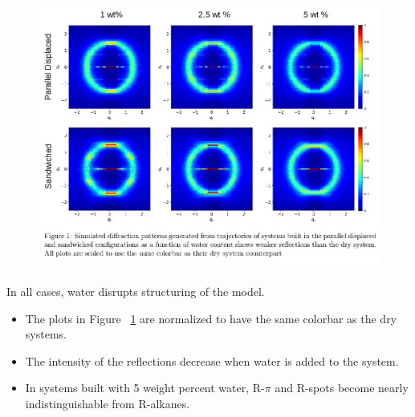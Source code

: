 \documentclass{article}
\begin{document}
  \begin{figure}
	\centering
	\includegraphics[width=\textwidth]{solvation.png}  %
	\label{fig:solvation}
  \end{figure}

  In all cases, water disrupts structuring of the model.
  \begin{itemize}
	\item The plots in Figure ~\ref{fig:solvation} are normalized 
	to have the same colorbar as the dry systems. 
	\item The intensity of the reflections decrease when water is 
	added to the system.
	\item In systems built with 5 weight percent water, R-$\pi$ and
	R-spots become nearly indistinguishable from R-alkanes.
  \end{itemize}
\end{document}
